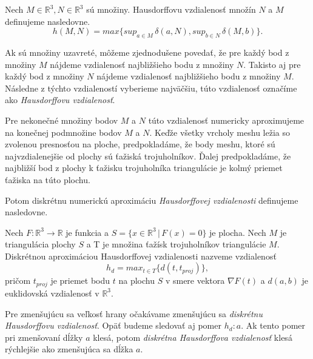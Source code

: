\begin{enumerate}
{    \begin{definition}
        Nech $M \in \mathbb{R}^3, N \in \mathbb{R}^3$ sú množiny.
        Hausdorffovu vzdialenosť množín $N$ a $M$ definujeme nasledovne.
        \begin{equation}
            h(M, N) = max \big \{sup_{a \in M} \, \delta(a, N), sup_{b \in N} \, \delta(M, b) \big \}.
        \end{equation}
    \end{definition}

    Ak sú množiny uzavreté, môžeme zjednodušene povedať, že pre každý bod z množiny $M$ nájdeme 
    vzdialenosť najbližšieho bodu z množiny $N$.
    Takisto aj pre každý bod z množiny $N$ nájdeme vzdialenosť najbližšieho bodu z množiny $M$.
    Následne z týchto vzdialeností vyberieme najväčšiu, túto vzdialenosť označíme ako 
    \textit{Hausdorffovu vzdialenosť}.

    Pre nekonečné množiny bodov $M$ a $N$ túto vzdialenosť numericky aproximujeme na konečnej 
    podmnožine bodov $M$ a $N$. Keďže všetky vrcholy meshu ležia so zvolenou presnosťou na ploche, 
    predpokladáme, že body meshu, ktoré sú najvzdialenejšie od plochy sú ťažiská trojuholníkov.
    Ďalej predpokladáme, že najbližší bod z plochy k ťažisku trojuholníka triangulácie
    je kolmý priemet ťažiska na túto plochu.

    Potom diskrétnu numerickú aproximáciu \textit{Hausdorffovej vzdialenosti} definujeme nasledovne.
    \begin{definition}
        Nech $F:\mathbb{R}^3 \to \mathbb{R}$ je funkcia a $S = \{x \in \mathbb{R}^3 \, | \, F(x)=0 \}$ 
        je plocha. Nech $M$ je triangulácia plochy $S$
        a T je množina ťažísk trojuholníkov triangulácie $M$.
        Diskrétnou aproximáciou Hausdorffovej vzdialenosti nazveme vzdialenosť
        \begin{equation}
            h_d = max_{t \in T} \big \{ d(t, t_{proj})\big \},
        \end{equation}
        pričom $t_{proj}$ je priemet bodu $t$ na plochu $S$ v smere vektora $\nabla F(t)$ a
        $d(a, b)$ je euklidovská vzdialenosť v $\mathbb{R}^3$.
    \end{definition}

    Pre zmenšujúcu sa veľkosť hrany očakávame zmenšujúcu sa \textit{diskrétnu Hausdorffovu vzdialenosť}.
    Opäť budeme sledovať aj pomer $h_d : a$. Ak tento pomer pri zmenšovaní dĺžky $a$ klesá, potom 
    \textit{diskrétna Hausdorffova vzdialenosť} klesá rýchlejšie ako zmenšujúca sa dĺžka $a$.

}
\end{enumerate}
